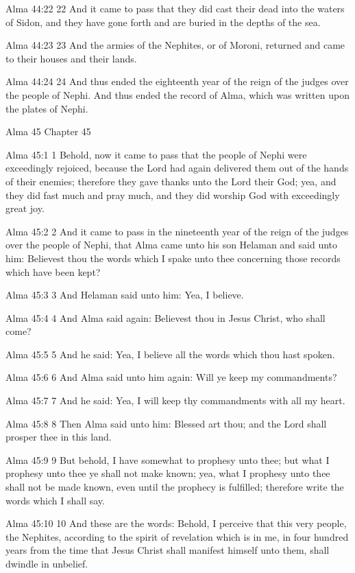 Alma 44:22
 22 And it came to pass that they did cast their dead into the
waters of Sidon, and they have gone forth and are buried in the
depths of the sea.

Alma 44:23
 23 And the armies of the Nephites, or of Moroni, returned and
came to their houses and their lands.

Alma 44:24
 24 And thus ended the eighteenth year of the reign of the judges
over the people of Nephi. And thus ended the record of Alma,
which was written upon the plates of Nephi.

Alma 45
Chapter 45

Alma 45:1
 1 Behold, now it came to pass that the people of Nephi were
exceedingly rejoiced, because the Lord had again delivered them
out of the hands of their enemies; therefore they gave thanks
unto the Lord their God; yea, and they did fast much and pray
much, and they did worship God with exceedingly great joy.

Alma 45:2
 2 And it came to pass in the nineteenth year of the reign of the
judges over the people of Nephi, that Alma came unto his son
Helaman and said unto him: Believest thou the words which I spake
unto thee concerning those records which have been kept?

Alma 45:3
 3 And Helaman said unto him: Yea, I believe.

Alma 45:4
 4 And Alma said again: Believest thou in Jesus Christ, who shall
come?

Alma 45:5
 5 And he said: Yea, I believe all the words which thou hast
spoken.

Alma 45:6
 6 And Alma said unto him again: Will ye keep my commandments?

Alma 45:7
 7 And he said: Yea, I will keep thy commandments with all my
heart.

Alma 45:8
 8 Then Alma said unto him: Blessed art thou; and the Lord shall
prosper thee in this land.

Alma 45:9
 9 But behold, I have somewhat to prophesy unto thee; but what I
prophesy unto thee ye shall not make known; yea, what I prophesy
unto thee shall not be made known, even until the prophecy is
fulfilled; therefore write the words which I shall say.

Alma 45:10
 10 And these are the words: Behold, I perceive that this very
people, the Nephites, according to the spirit of revelation which
is in me, in four hundred years from the time that Jesus Christ
shall manifest himself unto them, shall dwindle in unbelief.


